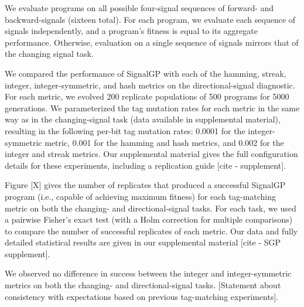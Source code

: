 We evaluate programs on all possible four-signal sequences of forward- and backward-signals (sixteen total).
For each program, we evaluate each sequence of signals independently, and a program's fitness is equal to its aggregate performance.
Otherwise, evaluation on a single sequence of signals mirrors that of the changing signal task.

We compared the performance of SignalGP with each of the hamming, streak, integer, integer-symmetric, and hash metrics on the directional-signal diagnostic.
For each metric, we evolved 200 replicate populations of 500 programs for 5000 generations.
We parameterized the tag mutation rates for each metric in the same way as in the changing-signal task (data available in supplemental material), resulting in the following per-bit tag mutation rates: 0.0001 for the integer-symmetric metric, 0.001 for the hamming and hash metrics, and 0.002 for the integer and streak metrics.
Our supplemental material gives the full configuration details for these experiments, including a replication guide [cite - supplement].




Figure [X] gives the number of replicates that produced a successful SignalGP program (i.e., capable of achieving maximum fitness) for each tag-matching metric on both the changing- and directional-signal tasks.
For each task, we used a pairwise Fisher's exact test (with a Holm correction for multiple comparisons) to compare the number of successful replicates of each metric.
Our data and fully detailed statistical results are given in our supplemental material [cite - SGP supplement].

We observed no difference in success between the integer and integer-symmetric metrics on both the changing- and directional-signal tasks.
[Statement about consistency with expectations based on previous tag-matching experiments].


